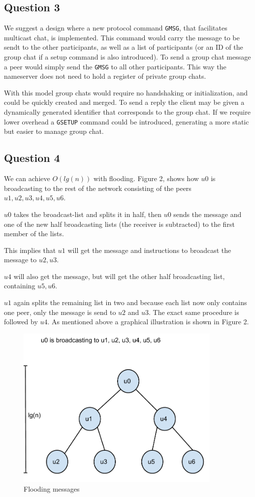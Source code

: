 \subsection{Question 3}
We suggest a design where a new protocol command {\tt GMSG}, that facilitates
multicast chat, is implemented. This command would carry the message to be sendt
to the other participants, as well as a list of participants (or an ID of the
group chat if a setup command is also introduced). To send a group chat message
a peer would simply send the {\tt GMSG} to all other participants. This way the
nameserver does not need to hold a register of private group chats.

With this model group chats would require no handshaking or initialization, and
could be quickly created and merged. To send a reply the client may be given a
dynamically generated identifier that corresponds to the group chat. If we require
lower overhead a {\tt GSETUP} command could be introduced, generating a more static
but easier to manage group chat.

\subsection{Question 4}
We can achieve $O(lg(n))$ with flooding. Figure 2, shows how $u0$ is
broadcasting to the rest of the network consisting of the peers
$u1,u2,u3,u4,u5,u6$.

$u0$ takes the broadcast-list and splits it in half, then $u0$ sends the
message and one of the new half broadcasting lists (the receiver
is subtracted) to the first member of the lists.

This implies that $u1$ will get the message and instructions to broadcast the
message to $u2, u3$.

$u4$ will also get the message, but will get the other half broadcasting list,
containing  $u5,u6$.

$u1$ again splits the remaining list in two and because each list now only
contains one peer, only the message is send to $u2$ and $u3$. The exact same
procedure is followed by $u4$. As mentioned above a graphical illustration is
shown in Figure 2.

\begin{figure}[!h]
    \centering
    \includegraphics[width=10cm]{graphics/flooding}
    \caption{Flooding messages}
\end{figure}


